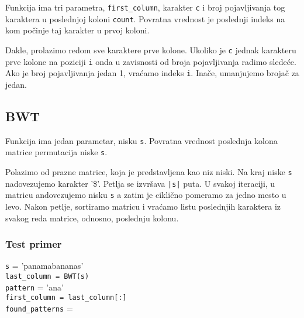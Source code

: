 Funkcija ima tri parametra, \texttt{first\_column}, karakter \texttt{c} i broj pojavljivanja tog karaktera u poslednjoj koloni \texttt{count}. Povratna vrednost je poslednji indeks na kom počinje taj karakter u prvoj koloni.

Dakle, prolazimo redom sve karaktere prve kolone. Ukoliko je \texttt{c} jednak karakteru prve kolone na poziciji \texttt{i} onda u zavisnosti od broja pojavljivanja radimo sledeće. Ako je broj pojavljivanja jedan 1, vraćamo indeks \texttt{i}. Inače, umanjujemo brojač za jedan.





\subsection{BWT}
\label{BWT}

Funkcija ima jedan parametar, nisku \texttt{s}. Povratna vrednost poslednja kolona matrice permutacija niske \texttt{s}.

Polazimo od prazne matrice, koja je predstavljena kao niz niski. Na kraj niske \texttt{s} nadovezujemo karakter '\$'. Petlja se izvršava \texttt{|s|} puta. U svakoj iteraciji, u matricu andovezujemo nisku \texttt{s} a zatim je ciklično pomeramo za jedno mesto u levo. Nakon petlje, sortiramo matricu i vraćamo listu poslednjih karaktera iz svakog reda matrice, odnosno, poslednju kolonu.




\subsubsection{Test primer}

\noindent\texttt{s} = 'panamabananas'
\\\texttt{last\_column = BWT(s)}
\\\texttt{pattern} = 'ana'
\\\texttt{first\_column = last\_column[:]}
\\\texttt{found\_patterns} = 

